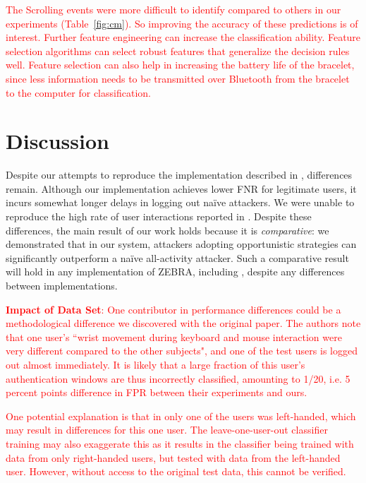 \documentclass[conference]{IEEEtran}
\newcommand{\zebra}{ZEBRA\xspace}
\newcommand{\allactivity}{all-activity\xspace}
\newcommand\changeOtto[1]{\textcolor{red}{#1}}
\newcommand\changeMika[1]{\textcolor{red}{#1}}
\newcommand\changeAsokan[1]{\textcolor{red}{#1}}
\newcommand\changeOtto[1]{{#1}}
\newcommand\changeMika[1]{{#1}}
\newcommand\changeAsokan[1]{{#1}}
\begin{document}
\changeMika{The Scrolling events were more difficult to identify compared to others in our experiments (Table~\ref{fig:cm}). So improving the accuracy of these predictions is of interest.} \changeMika{Further feature engineering can increase the classification ability. Feature selection algorithms can select robust features that generalize the decision rules well. Feature selection can also help in increasing the battery life of the bracelet, since less information needs to be transmitted over Bluetooth from the bracelet to the computer for classification.}




\section{Discussion} 
\label{subsec:implementation_differences}
Despite our attempts to reproduce
the implementation described in \cite{mare2014zebra}, differences
remain. Although our implementation achieves lower FNR for legitimate
users, it incurs somewhat longer delays in logging out na\"ive
attackers. We were unable to reproduce the high rate of user interactions reported in \cite{mare2014zebra}. Despite these differences, the main result of our work holds because it is \textit{comparative}: we demonstrated that in our system, attackers adopting opportunistic strategies can significantly outperform a na\"ive \allactivity attacker. Such a comparative result will hold in any implementation of \zebra, including \cite{mare2014zebra}, despite any differences between implementations.

\vspace{1mm}
\changeMika{\noindent\textbf{Impact of Data Set}: }
\changeOtto{One contributor in performance differences could be a methodological difference we discovered with the original paper. The authors note that one user's ``wrist movement during keyboard and mouse interaction were very different compared to the other subjects", and one of the test users is logged out almost immediately. It is likely that a large fraction of this user's authentication windows are thus incorrectly classified, amounting to 1/20, i.e. 5 percent points difference in FPR between} \changeAsokan{their experiments and ours.}

\changeOtto{One potential explanation is that in \cite{mare2014zebra} only one of the users was left-handed, which may result in differences for this one user. The leave-one-user-out classifier training may also exaggerate this as it results in the classifier being trained with data from only right-handed users, but tested with data from the left-handed user. However, without access to the original test data, this cannot be verified.}
\end{document}
